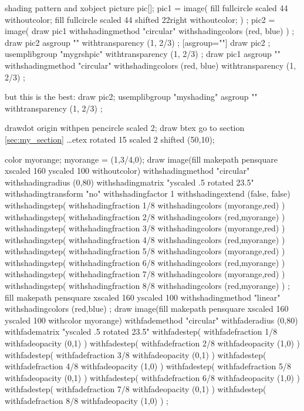 \documentclass[a4paper]{article}
\begin{document}
shading pattern and xobject
\mpfig*
picture pic[];
pic1 = image(
fill fullcircle scaled 44 withoutcolor;
fill fullcircle scaled 44 shifted 22right withoutcolor;
) ;
pic2 = image( draw pic1
withshadingmethod "circular"
withshadingcolors (red, blue) %
) ;
\endmpfig
\mpfig
draw pic2
asgroup ""
withtransparency (1, 2/3) ;
\endmpfig
{}[asgroup=""]
\mpfig[off]
draw pic2 ;
\endmpfig
\endmplibgroup
\mpfig
usemplibgroup "mygrshpic"
withtransparency (1, 2/3) ;
\endmpfig
\mpfig %
draw pic1
asgroup ""
withshadingmethod "circular"
withshadingcolors (red, blue)
withtransparency (1, 2/3) ;
\endmpfig

\leavevmode\qquad\qquad but this is the best:
\mpfig[off]
  draw pic2;
\endmpfig
\endmplibgroup
\mpfig
  usemplibgroup "myshading" asgroup "" withtransparency (1, 2/3) ;
\endmpfig

\mpfig[text]
  drawdot origin withpen pencircle scaled 2;
  draw btex go to section \ref{sec:my_section} \dots etex rotated 15 scaled 2 shifted (50,10);
\endmpfig

\leavevmode
\mpfig
  color myorange; myorange = (1,3/4,0);
  draw image(fill makepath pensquare xscaled 160 yscaled 100 withoutcolor)
    withshadingmethod "circular"
    withshadingradius (0,80)
    withshadingmatrix "yscaled .5 rotated 23.5"
    withshadingtransform "no"
    withshadingfactor 1
    withshadingextend (false, false)
    withshadingstep(
      withshadingfraction 1/8
      withshadingcolors (myorange,red)
    )
    withshadingstep(
      withshadingfraction 2/8
      withshadingcolors (red,myorange)
    )
    withshadingstep(
      withshadingfraction 3/8
      withshadingcolors (myorange,red)
    )
    withshadingstep(
      withshadingfraction 4/8
      withshadingcolors (red,myorange)
    )
    withshadingstep(
      withshadingfraction 5/8
      withshadingcolors (myorange,red)
    )
    withshadingstep(
      withshadingfraction 6/8
      withshadingcolors (red,myorange)
    )
    withshadingstep(
      withshadingfraction 7/8
      withshadingcolors (myorange,red)
    )
    withshadingstep(
      withshadingfraction 8/8
      withshadingcolors (red,myorange)
    ) ;
\endmpfig
\mpfig
  fill makepath pensquare xscaled 160 yscaled 100
    withshadingmethod "linear"
    withshadingcolors (red,blue)
    ;
  draw image(fill makepath pensquare xscaled 160 yscaled 100 withcolor myorange)
    withfademethod "circular"
    withfaderadius (0,80)
    withfadematrix "yscaled .5 rotated 23.5"
    withfadestep(
      withfadefraction 1/8
      withfadeopacity (0,1)
    )
    withfadestep(
      withfadefraction 2/8
      withfadeopacity (1,0)
    )
    withfadestep(
      withfadefraction 3/8
      withfadeopacity (0,1)
    )
    withfadestep(
      withfadefraction 4/8
      withfadeopacity (1,0)
    )
    withfadestep(
      withfadefraction 5/8
      withfadeopacity (0,1)
    )
    withfadestep(
      withfadefraction 6/8
      withfadeopacity (1,0)
    )
    withfadestep(
      withfadefraction 7/8
      withfadeopacity (0,1)
    )
    withfadestep(
      withfadefraction 8/8
      withfadeopacity (1,0)
    ) ;
\endmpfig
\end{document}
